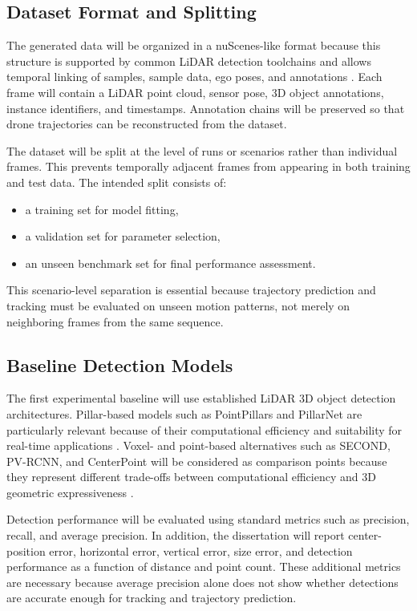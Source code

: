 \subsection{Dataset Format and Splitting}

The generated data will be organized in a nuScenes-like format because this structure is supported by common LiDAR detection toolchains and allows temporal linking of samples, sample data, ego poses, and annotations \cite{caesar2020nuscenes,openpcdet2020}. Each frame will contain a LiDAR point cloud, sensor pose, 3D object annotations, instance identifiers, and timestamps. Annotation chains will be preserved so that drone trajectories can be reconstructed from the dataset.

The dataset will be split at the level of runs or scenarios rather than individual frames. This prevents temporally adjacent frames from appearing in both training and test data. The intended split consists of:

\begin{itemize}
\item a training set for model fitting,
\item a validation set for parameter selection,
\item an unseen benchmark set for final performance assessment.
\end{itemize}

This scenario-level separation is essential because trajectory prediction and tracking must be evaluated on unseen motion patterns, not merely on neighboring frames from the same sequence.

\subsection{Baseline Detection Models}

The first experimental baseline will use established LiDAR 3D object detection architectures. Pillar-based models such as PointPillars and PillarNet are particularly relevant because of their computational efficiency and suitability for real-time applications \cite{lang2019pointpillars,shi2022pillarnet}. Voxel- and point-based alternatives such as SECOND, PV-RCNN, and CenterPoint will be considered as comparison points because they represent different trade-offs between computational efficiency and 3D geometric expressiveness \cite{yan2018second,shi2020pvrcnn,yin2021centerpoint}.

Detection performance will be evaluated using standard metrics such as precision, recall, and average precision. In addition, the dissertation will report center-position error, horizontal error, vertical error, size error, and detection performance as a function of distance and point count. These additional metrics are necessary because average precision alone does not show whether detections are accurate enough for tracking and trajectory prediction.


